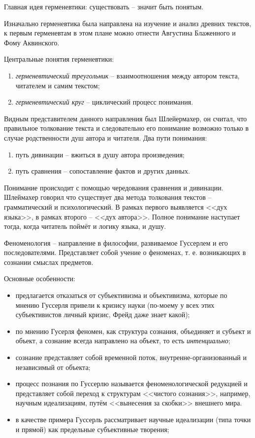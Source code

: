 Главная идея герменевтики: существовать -- значит быть понятым.

Изначально герменевтика была направлена на изучение и анализ древних текстов, к первым герменевтам в этом плане можно отнести Августина Блаженного и Фому Аквинского.

Центральные понятия герменевтики: 
\begin{enumerate}
	\item \textit{герменевтический треугольник} -- взаимоотношения между автором текста, читателем и самим текстом;
	\item \textit{герменевтический круг} -- циклический процесс понимания.
\end{enumerate}

Видным представителем данного направления был Шлейермахер, он считал, что правильное толкование текста и следовательно его понимание возможно только в случае родственности душ автора и читателя. Два пути понимания:
\begin{enumerate}
	\item путь дивинации -- вжиться в душу автора произведения;
	\item путь сравнения -- сопоставление фактов и других данных.
\end{enumerate}

Понимание происходит с помощью чередования сравнения и дивинации. Шлеймахер говорил что существует два метода толкования текстов -- грамматический и психологический. В рамках первого выявляется <<дух языка>>, в рамках второго -- <<дух автора>>. Полное понимание наступает тогда, когда читатель поймёт и логику языка, и душу.

Феноменология -- направление в философии, развиваемое Гуссерлем и его последователями. Представляет собой учение о феноменах, т. е. возникающих в сознании смыслах предметов.

Основные особенности:
\begin{itemize}
	\item предлагается отказаться от субъективизма и объективизма, которые по мнению Гуссерля привели к кризису науки (по-моему у всех этих субъективистов личный кризис, Фрейд даже знает какой);
	\item по мнению Гусерля феномен, как структура сознания, объединяет и субъект и объект, а сознание всегда направлено на объект, то есть \textit{интенциально};
	\item сознание представляет собой временной поток, внутренне-организованный и независимый от объекта;
	\item процесс познания по Гуссерлю называется феноменологической редукцией и представляет собой переход к структурам <<чистого сознания>>, например, научным идеализациям, путём <<вынесения за скобки>> внешнего мира.
	\item в качестве примера Гуссерль рассматривает научные идеализации (типа точки и прямой) как предельные субъективные творения; 
\end{itemize}

